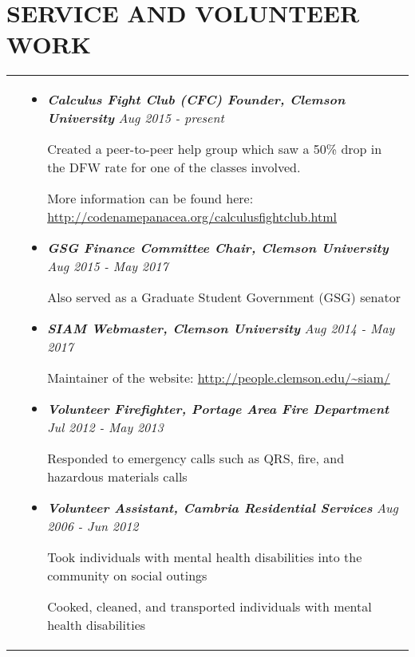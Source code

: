 \documentclass[10pt]{article}
\begin{document}
\section{\textbf{SERVICE AND VOLUNTEER WORK}}
\vspace*{-\baselineskip}
\hskip-1.7in
\begin{tabularx}{1.5\linewidth}{>{\raggedleft\scshape}p{3cm}X}

  &\begin{itemize}
    \setlength\itemsep{.005em}      
     \item \textbf{\textit{Calculus Fight Club (CFC) Founder, Clemson University}}    \hspace{22 mm}\textit{Aug 2015 - present}
  
   
Created a peer-to-peer help group which saw a 50\% drop in the DFW rate for one of the classes involved.

More information can be found here:  \url{http://codenamepanacea.org/calculusfightclub.html}
    
                             \item \textbf{\textit{GSG Finance Committee Chair, Clemson University}}    \hspace{30 mm}\textit{Aug 2015 - May 2017}
  
   
   Also served as a Graduate Student Government (GSG) senator
                    
    
\item \textbf{\textit{SIAM Webmaster, Clemson University}} \hspace{54 mm}\textit{Aug 2014 - May 2017 }
  
    Maintainer of the website: \url{http://people.clemson.edu/~siam/}
                 
             
\item \textbf{\textit{Volunteer Firefighter, Portage Area Fire Department}} \hspace{30 mm}\textit{Jul 2012 \hspace{.1mm} - May 2013}
  
   Responded to emergency calls such as QRS, fire, and hazardous materials calls

  \item \textbf{\textit{Volunteer Assistant, Cambria Residential Services}}    \hspace{34.5 mm}\textit{Aug 2006 - Jun 2012}
  
   Took individuals with mental health disabilities into the community on social outings
   
   Cooked, cleaned, and transported individuals with mental health disabilities
          
  \end{itemize} 

\end{tabularx}
\end{document}
